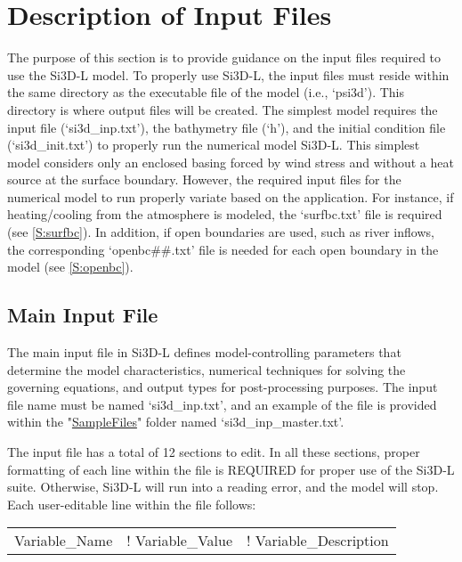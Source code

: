 \section{Description of Input Files}

The purpose of this section is to provide guidance on the input files required to use the Si3D-L model. To properly use Si3D-L, the input files must reside within the same directory as the executable file of the model (i.e., `psi3d'). This directory is where output files will be created. The simplest model requires the input file (`si3d\_inp.txt'), the bathymetry file (`h'), and the initial condition file (`si3d\_init.txt') to properly run the numerical model Si3D-L. This simplest model considers only an enclosed basing forced by wind stress and without a heat source at the surface boundary. However, the required input files for the numerical model to run properly variate based on the application. For instance, if heating/cooling from the atmosphere is modeled, the `surfbc.txt' file is required (see \ref{S:surfbc}). In addition, if open boundaries are used, such as river inflows, the corresponding `openbc\#\#.txt' file is needed for each open boundary in the model (see \ref{S:openbc}).

\subsection{Main Input File}
\label{S:Main}

The main input file in Si3D-L defines model-controlling parameters that determine the model characteristics, numerical techniques for solving the governing equations, and output types for post-processing purposes. The input file name must be named `si3d\_inp.txt', and an example of the file is provided within the "\href{https://github.com/SI3DL/psi3d/tree/main/SampleFiles}{SampleFiles}" folder named `si3d\_inp\_master.txt'. 

The input file has a total of 12 sections to edit. In all these sections, proper formatting of each line within the file is REQUIRED for proper use of the Si3D-L suite. Otherwise, Si3D-L will run into a reading error, and the model will stop. Each user-editable line within the file follows:

\begin{table}[h]
    \centering
    \begin{tabular}{c c c}
        Variable\_Name & ! Variable\_Value & ! Variable\_Description
    \end{tabular}
    \label{tab:inputformat}
\end{table}

